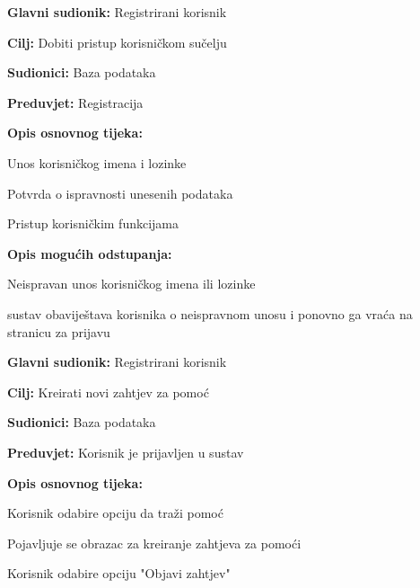 \noindent {}
\begin{packed_item}
	\item \textbf{Glavni sudionik: }Registrirani korisnik
	\item  \textbf{Cilj:} Dobiti pristup korisničkom sučelju
	\item  \textbf{Sudionici:} Baza podataka
	\item  \textbf{Preduvjet:} Registracija
	\item  \textbf{Opis osnovnog tijeka:}
	\item[] \begin{packed_enum}
		\item Unos korisničkog imena i lozinke
		\item Potvrda o ispravnosti unesenih podataka
		\item Pristup korisničkim funkcijama
	\end{packed_enum}
	\item  \textbf{Opis mogućih odstupanja:}
	\item[] \begin{packed_item}
		\item[1.a] Neispravan unos korisničkog imena ili lozinke
		\item[] \begin{packed_enum}
			\item sustav obaviještava korisnika o neispravnom unosu i ponovno ga vraća na stranicu za prijavu
		\end{packed_enum}
	\end{packed_item}
\end{packed_item}

\noindent {}
\begin{packed_item}
	\item \textbf{Glavni sudionik: } Registrirani korisnik
	\item  \textbf{Cilj:} Kreirati novi zahtjev za pomoć
	\item  \textbf{Sudionici:} Baza podataka
	\item  \textbf{Preduvjet:} Korisnik je prijavljen u sustav
	\item  \textbf{Opis osnovnog tijeka:}
	\item[] \begin{packed_enum}
		\item Korisnik odabire opciju da traži pomoć
		\item Pojavljuje se obrazac za kreiranje zahtjeva za pomoći
		\item Korisnik odabire opciju "Objavi zahtjev"
	\end{packed_enum}
\end{packed_item}

